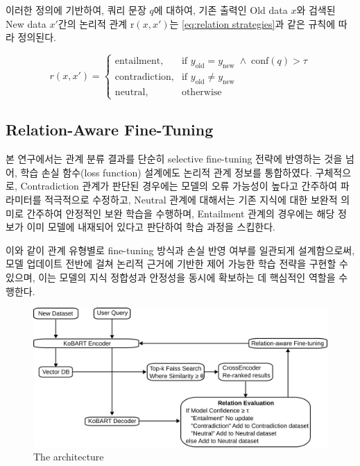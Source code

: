 \documentclass[a4paper,fleqn]{cas-sc}
\begin{document}
이러한 정의에 기반하여, 쿼리 문장 \( q \)에 대하여, 기존 출력인 Old data \( x \)와 검색된 New data \( x' \)간의 논리적 관계 \( \mathrm{r}(x,x') \)는 \cref{eq:relation strategies}과 같은 규칙에 따라 정의된다. 

\begin{equation}
    r(x, x') =
    \begin{cases}
    \text{entailment}, & \text{if } y_{\text{old}} = y_{\text{new}} \;\land\; \mathrm{conf}(q) > \tau \\
    \text{contradiction}, & \text{if } y_{\text{old}} \ne y_{\text{new}} \ \\
    \text{neutral}, & \text{otherwise}
    \end{cases}
    \label{eq:relation strategies}
    \end{equation}


\subsection{Relation-Aware Fine-Tuning}
   
본 연구에서는 관계 분류 결과를 단순히 selective fine-tuning 전략에 반영하는 것을 넘어, 학습 손실 함수(loss function) 설계에도 논리적 관계 정보를 통합하였다. 구체적으로, Contradiction 관계가 판단된 경우에는 모델의 오류 가능성이 높다고 간주하여 파라미터를 적극적으로 수정하고, Neutral 관계에 대해서는 기존 지식에 대한 보완적 의미로 간주하여 안정적인 보완 학습을 수행하며, Entailment 관계의 경우에는 해당 정보가 이미 모델에 내재되어 있다고 판단하여 학습 과정을 스킵한다.

이와 같이 관계 유형별로 fine-tuning 방식과 손실 반영 여부를 일관되게 설계함으로써, 모델 업데이트 전반에 걸쳐 논리적 근거에 기반한 제어 가능한 학습 전략을 구현할 수 있으며, 이는 모델의 지식 정합성과 안정성을 동시에 확보하는 데 핵심적인 역할을 수행한다.
\begin{figure}[htbp]
    \centering
    \includegraphics[width=\textwidth]{flow.png}
    \caption{The architecture }
\end{figure}
\end{document}
